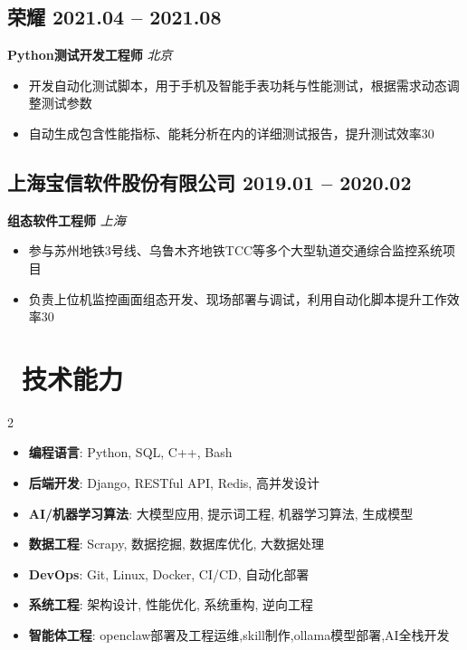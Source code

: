 \documentclass[11pt, a4paper]{article}
\newcommand{\dates}[1]{\hfill\textcolor{light}{\small #1}}  %
\begin{document}
\vspace{0.5em}

\subsection*{荣耀 \dates{2021.04 -- 2021.08}}
\textbf{Python测试开发工程师} \hfill \textit{北京}

\begin{itemize}
    \item 开发自动化测试脚本，用于手机及智能手表功耗与性能测试，根据需求动态调整测试参数
    \item 自动生成包含性能指标、能耗分析在内的详细测试报告，提升测试效率30%
\end{itemize}

\vspace{0.5em}

\subsection*{上海宝信软件股份有限公司 \dates{2019.01 -- 2020.02}}
\textbf{组态软件工程师} \hfill \textit{上海}

\begin{itemize}
    \item 参与苏州地铁3号线、乌鲁木齐地铁TCC等多个大型轨道交通综合监控系统项目
    \item 负责上位机监控画面组态开发、现场部署与调试，利用自动化脚本提升工作效率30%
\end{itemize}

\section*{\faCogs\ 技术能力}

\begin{multicols}{2}
\begin{itemize}
    \item \textbf{编程语言}: Python, SQL, C++, Bash
    \item \textbf{后端开发}: Django, RESTful API, Redis, 高并发设计
    \item \textbf{AI/机器学习算法}: 大模型应用, 提示词工程, 机器学习算法, 生成模型
    \item \textbf{数据工程}: Scrapy, 数据挖掘, 数据库优化, 大数据处理
    \item \textbf{DevOps}: Git, Linux, Docker, CI/CD, 自动化部署
    \item \textbf{系统工程}: 架构设计, 性能优化, 系统重构, 逆向工程
    \item \textbf{智能体工程}: openclaw部署及工程运维,skill制作,ollama模型部署,AI全栈开发
\end{itemize}
\end{multicols}
\end{document}
